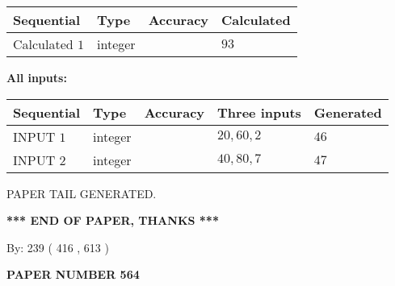 \documentclass[12pt]{article}
\begin{document}
   
  
  
\noindent\begin{tabular}{|l|l|l|l|}
\hline
 Sequential & Type & Accuracy & Calculated \\ 
\hline
 
 
  Calculated $  1 $ & integer &  & 
  $ 93 $ 
 \\  \hline  
 \end{tabular}
   
   
   
   
\noindent\vspace{0.1in}\hspace{-0.08in} {\textbf{\Large{All inputs: }}}
   
   
  
  
\noindent\begin{tabular}{|l|l|l|l|l|}
\hline
 Sequential & Type & Accuracy & Three inputs & Generated \\ 
\hline
 
 
  INPUT $  1 $ & integer &  & $
 20
 , 
 60
 , 
 2
 $ & $ 46 $ 
 \\  \hline  
 
 
  INPUT $  2 $ & integer &  & $
 40
 , 
 80
 , 
 7
 $ & $ 47 $ 
 \\  \hline  
 \end{tabular}
   
   
   
   
   
   
 \vspace{0.2in}
 
   
   
\vspace{2.0in} PAPER TAIL GENERATED.
   
   
   
   
\vspace{1.0in} 
{\textbf{\large{ *** END OF PAPER, THANKS *** }}} 
   
   
\hspace{1.0in} By: 
 239 ( 416 ,  613 )
   
   
   
   
\newpage 
\setcounter{page}{ 
   564001 } 
   
   
   
   
 {\textbf{ \Large{ PAPER NUMBER  564  }}}
   
   
\vspace{0.2in}
   
   
   
\end{document}
